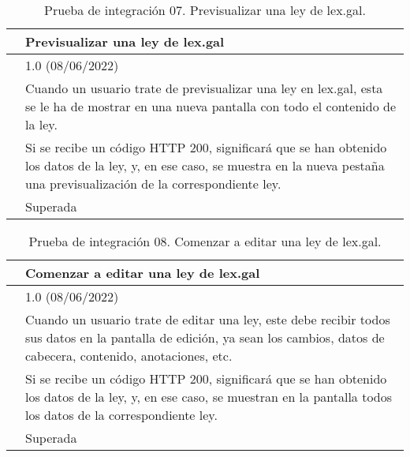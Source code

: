 \begin{table}[H]
\begin{center}
\begin{tabular}{|p{3cm}|p{10cm}|} \hline
\centering {\bf PI-07} & Previsualizar una ley de lex.gal  \\ \hline\hline
\centering {\bf Versión} & 1.0 (08/06/2022) \\ \hline
\centering {\bf Descripción} & Cuando un usuario trate de previsualizar una ley en lex.gal, esta se le ha de mostrar en una nueva pantalla con todo el contenido de la ley. \\ \hline
\centering {\bf Criterio de aceptación} & Si se recibe un código HTTP 200, significará que se han obtenido los datos de la ley, y, en ese caso, se muestra en la nueva pestaña una previsualización de la correspondiente ley. \\ \hline
\centering {\bf Estado} & Superada \\ \hline
\end{tabular}
\caption{Prueba de integración 07. Previsualizar una ley de lex.gal.}
\label{enlacePI7}
\end{center}
\end{table}

\begin{table}[H]
\begin{center}
\begin{tabular}{|p{3cm}|p{10cm}|} \hline
\centering {\bf PI-08} & Comenzar a editar una ley de lex.gal  \\ \hline\hline
\centering {\bf Versión} & 1.0 (08/06/2022) \\ \hline
\centering {\bf Descripción} & Cuando un usuario trate de editar una ley, este debe recibir todos sus datos en la pantalla de edición, ya sean los cambios, datos de cabecera, contenido, anotaciones, etc. \\ \hline
\centering {\bf Criterio de aceptación} & Si se recibe un código HTTP 200, significará que se han obtenido los datos de la ley, y, en ese caso, se muestran en la pantalla todos los datos de la correspondiente ley. \\ \hline
\centering {\bf Estado} & Superada \\ \hline
\end{tabular}
\caption{Prueba de integración 08. Comenzar a editar una ley de lex.gal.}
\label{enlacePI8}
\end{center}
\end{table}

